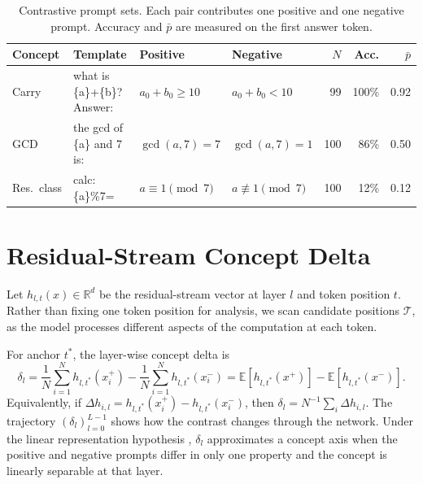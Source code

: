 \begin{table}[ht!]
\centering
\setlength{\tabcolsep}{4pt}
\footnotesize
\begin{tabular}{@{}l l l l r r r@{}}
\toprule
Concept & Template
        & Positive
        & Negative
        & $N$
        & Acc.
        & $\bar{p}$ \\
\midrule
Carry
  & {\sffamily\scriptsize what is \{a\}+\{b\}? Answer:}
  & $a_0{+}b_0\!\geq\!10$
  & $a_0{+}b_0\!<\!10$
  & 99 & 100\% & 0.92 \\[3pt]
GCD
  & {\sffamily\scriptsize the gcd of \{a\} and 7 is:}
  & $\gcd(a,7)=7$
  & $\gcd(a,7)=1$
  & 100 & 86\% & 0.50 \\[3pt]
Res.\ class
  & {\sffamily\scriptsize calc: \{a\}\%7=}
  & $a \equiv 1 \pmod{7}$
  & $a \not\equiv 1 \pmod{7}$
  & 100 & 12\% & 0.12 \\
\bottomrule
\end{tabular}
\caption{Contrastive prompt sets.  Each pair contributes one positive and one
negative prompt.  Accuracy and $\bar{p}$ are measured on the first
answer token.}
\label{tab:concept_pairs}
\end{table}

\section{Residual-Stream Concept Delta}
\label{sec:concept_delta}

Let \(h_{l,t}(x) \in \mathbb{R}^d\) be the residual-stream vector at layer \(l\)
and token position \(t\). Rather than fixing one token position for analysis, 
we scan candidate positions \(\mathcal{T}\),
as the model processes different aspects of the computation at each token.

For anchor \(t^*\), the layer-wise concept delta is
\begin{equation}
\delta_l
=
\frac{1}{N}\sum_{i=1}^{N} h_{l,t^*}(x_i^+)
-
\frac{1}{N}\sum_{i=1}^{N} h_{l,t^*}(x_i^-)
=
\mathbb{E}[h_{l,t^*}(x^+)]-\mathbb{E}[h_{l,t^*}(x^-)].
\label{eq:concept_delta}
\end{equation}
Equivalently, if \(\Delta h_{i,l}=h_{l,t^*}(x_i^+)-h_{l,t^*}(x_i^-)\), then
\(\delta_l=N^{-1}\sum_i \Delta h_{i,l}\). The trajectory \((\delta_l)_{l=0}^{L-1}\) shows how the contrast changes through
the network. Under the linear representation hypothesis \citep{park2023linear},
\(\delta_l\) approximates a concept axis when the positive and
 negative prompts differ in only one property and the
concept is linearly separable at that layer.

